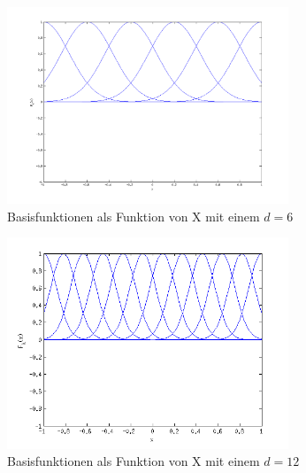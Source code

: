 \begin{figure}[h!]

\begin{center}
 \includegraphics[width=0.75\textwidth]{./figures/RBF_6}
 \caption[Basisfunktionen als Funktion von X (d=6)]{Basisfunktionen als Funktion von X mit einem $d=6$}
\label{fig:RBF_6}
\end{center}
\end{figure}

\begin{figure}[h!]
\begin{center}
 \includegraphics[width=0.75\textwidth]{./figures/RBF_12}
 \caption[Basisfunktionen als Funktion von X, d=12]{Basisfunktionen als Funktion von X mit einem $d=12$}
\label{fig:RBF_12}
\end{center}
\end{figure}


